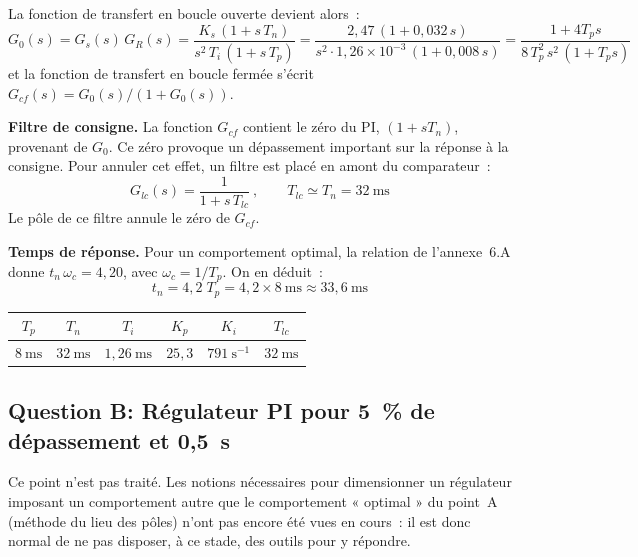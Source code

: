 ﻿\documentclass[a4paper,5pt]{article}
\begin{document}
La fonction de transfert en boucle ouverte devient alors~:
\begin{equation}
G_0(s) = G_s(s)\,G_R(s) = \frac{K_s\,(1 + s\,T_n)}{s^{2}\,T_i\,(1 + s\,T_p)}
= \frac{2{,}47\,(1 + 0{,}032\,s)}{s^{2}\cdot 1{,}26\times10^{-3}\,(1 + 0{,}008\,s)}
= \frac{1+4T_p s}{8\,T_p^{2}\,s^{2}\,(1+T_p s)}
\end{equation}
et la fonction de transfert en boucle fermée s'écrit
$G_{cf}(s) = G_0(s)/(1+G_0(s))$.

\textbf{Filtre de consigne.} La fonction $G_{cf}$ contient le zéro du PI,
$(1+sT_n)$, provenant de $G_{0}$. Ce zéro provoque un dépassement important sur
la réponse à la consigne. Pour annuler cet effet, un filtre est placé en amont
du comparateur~:
\begin{equation}
G_{lc}(s) = \frac{1}{1 + s\,T_{lc}}\ ,\qquad T_{lc} \simeq T_n = 32~\mathrm{ms}
\end{equation}
Le pôle de ce filtre annule le zéro de $G_{cf}$.

\textbf{Temps de réponse.} Pour un comportement optimal, la relation de
l'annexe~6.A donne $t_n\,\omega_c = 4{,}20$, avec $\omega_c = 1/T_p$. On en
déduit~:
\begin{equation}
t_n = 4{,}2\;T_p = 4{,}2 \times 8~\mathrm{ms} \approx \boxed{33{,}6~\mathrm{ms}}
\end{equation}

\begin{center}
\begin{tabular}{cccccc}
\toprule
$T_p$ & $T_n$ & $T_i$ & $K_p$ & $K_i$ & $T_{lc}$ \\
\midrule
$8~\mathrm{ms}$ & $32~\mathrm{ms}$ & $1{,}26~\mathrm{ms}$ & $25{,}3$ & $791~\mathrm{s^{-1}}$ & $32~\mathrm{ms}$ \\
\bottomrule
\end{tabular}
\end{center}

\subsection{Question B: Régulateur PI pour 5~\% de dépassement et 0,5~s}
\label{sec:B}

Ce point n'est pas traité. Les notions nécessaires pour dimensionner un
régulateur imposant un comportement autre que le comportement « optimal » du
point~A (méthode du lieu des pôles) n'ont pas encore été vues en cours~: il est
donc normal de ne pas disposer, à ce stade, des outils pour y répondre.
\end{document}
